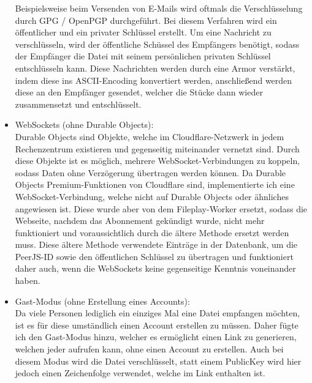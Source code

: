 \documentclass[a4paper]{article}
\begin{document}
\begin{itemize}
            Beispielsweise beim Versenden von E-Mails wird oftmals die
            Verschlüsselung durch GPG / OpenPGP durchgeführt. Bei diesem
            Verfahren wird ein öffentlicher und ein privater Schlüssel erstellt.
            Um eine Nachricht zu verschlüsseln, wird der öffentliche Schüssel
            des Empfängers benötigt, sodass der Empfänger die Datei mit seinem
            persönlichen privaten Schlüssel entschlüsseln kann. Diese
            Nachrichten werden durch eine Armor verstärkt, indem diese ins
            ASCII-Encoding konvertiert werden, anschließend werden diese an den
            Empfänger gesendet, welcher die Stücke dann wieder zusammensetzt und
            entschlüsselt.
      \item WebSockets (ohne Durable Objects):\\
            Durable Objects sind Objekte, welche im Cloudflare-Netzwerk in jedem
            Rechenzentrum existieren und gegenseitig miteinander vernetzt sind.
            Durch diese Objekte ist es möglich, mehrere WebSocket-Verbindungen
            zu koppeln, sodass Daten ohne Verzögerung übertragen werden können.
            Da Durable Objects Premium-Funktionen von Cloudflare sind,
            implementierte ich eine WebSocket-Verbindung, welche nicht auf
            Durable Objects oder ähnliches angewiesen ist. Diese wurde aber von
            dem Fileplay-Worker ersetzt, sodass die Webseite, nachdem das
            Abonnement gekündigt wurde, nicht mehr funktioniert und
            voraussichtlich durch die ältere Methode ersetzt werden muss. Diese
            ältere Methode verwendete Einträge in der Datenbank, um die
            PeerJS-ID sowie den öffentlichen Schlüssel zu übertragen und
            funktioniert daher auch, wenn die WebSockets keine gegenseitige
            Kenntnis voneinander haben.
      \item Gast-Modus (ohne Erstellung eines Accounts):\\
            Da viele Personen lediglich ein einziges Mal eine Datei empfangen
            möchten, ist es für diese umständlich einen Account erstellen zu
            müssen. Daher fügte ich den Gast-Modus hinzu, welcher es ermöglicht
            einen Link zu generieren, welchen jeder aufrufen kann, ohne einen
            Account zu erstellen. Auch bei diesem Modus wird die Datei
            verschlüsselt, statt einem PublicKey wird hier jedoch einen
            Zeichenfolge verwendet, welche im Link enthalten ist.
\end{itemize}
\end{document}
